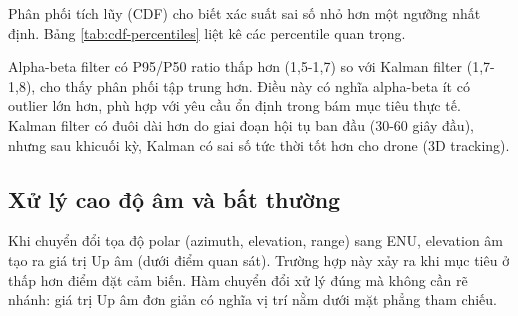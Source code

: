 \hspace{0.5cm} Phân phối tích lũy (CDF) cho biết xác suất sai số nhỏ hơn một ngưỡng nhất định. Bảng \ref{tab:cdf-percentiles} liệt kê các percentile quan trọng.



\begin{table}[H]
\centering
{}
\caption{Phân vị sai số từ CDF (seed=42, 120 giây)}
\label{tab:cdf-percentiles}
\end{table}

Alpha-beta filter có P95/P50 ratio thấp hơn (1,5-1,7) so với Kalman filter (1,7-1,8), cho thấy phân phối tập trung hơn. Điều này có nghĩa alpha-beta ít có outlier lớn hơn, phù hợp với yêu cầu ổn định trong bám mục tiêu thực tế. Kalman filter có đuôi dài hơn do giai đoạn hội tụ ban đầu (30-60 giây đầu), nhưng sau khicuối kỳ, Kalman có sai số tức thời tốt hơn cho drone (3D tracking).

\subsection{Xử lý cao độ âm và bất thường}

\hspace{0.5cm} Khi chuyển đổi tọa độ polar (azimuth, elevation, range) sang ENU, elevation âm tạo ra giá trị Up âm (dưới điểm quan sát). Trường hợp này xảy ra khi mục tiêu ở thấp hơn điểm đặt cảm biến. Hàm chuyển đổi xử lý đúng mà không cần rẽ nhánh: giá trị Up âm đơn giản có nghĩa vị trí nằm dưới mặt phẳng tham chiếu.


